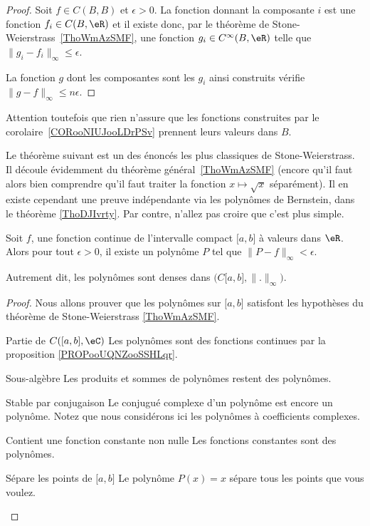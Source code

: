 \begin{proof}
    Soit \( f \in C(B,B)\) et \( \epsilon>0\). La fonction donnant la composante \( i\) est une fonction \( f_i\in C(B,\eR)\) et il existe donc, par le théorème de Stone-Weierstrass~\ref{ThoWmAzSMF}, une fonction \( g_i\in  C^{\infty}(B,\eR)\) telle que \( \| g_i-f_i \|_{\infty}\leq \epsilon\).

    La fonction \( g\) dont les composantes sont les \( g_i\) ainsi construits vérifie \( \| g-f \|_{\infty}\leq n\epsilon\).
\end{proof}

Attention toutefois que rien n'assure que les fonctions construites par le corolaire~\ref{CORooNIUJooLDrPSv} prennent leurs valeurs dans \( B\).

Le théorème suivant est un des énoncés les plus classiques de Stone-Weierstrass. Il découle évidemment du théorème général~\ref{ThoWmAzSMF} (encore qu'il faut alors bien comprendre qu'il faut traiter la fonction \( x\mapsto \sqrt{x}\) séparément). Il en existe cependant une preuve indépendante via les polynômes de Bernstein, dans le théorème \ref{ThoDJIvrty}. Par contre, n'allez pas croire que c'est plus simple.

\begin{theorem}     \label{ThoGddfas}   
    Soit \( f\), une fonction continue de l'intervalle compact \( \mathopen[ a , b \mathclose]\) à valeurs dans \( \eR\). Alors pour tout \( \epsilon>0\), il existe un polynôme \( P\) tel que \( \| P-f \|_{\infty}<\epsilon\).

    Autrement dit, les polynômes sont denses dans \(\big(  C\mathopen[ a , b \mathclose],\| . \|_{\infty}\big)\).
\end{theorem}

\begin{proof}
    Nous allons prouver que les polynômes sur \( \mathopen[ a , b \mathclose]\) satisfont les hypothèses du théorème de Stone-Weierstrass \ref{ThoWmAzSMF}.
    \begin{subproof}
    \item[Partie de $ C(\lbrack a , b\rbrack,\eC)$]
        Les polynômes sont des fonctions continues par la proposition \ref{PROPooUQNZooSSHLqr}.
    \item[Sous-algèbre]
        Les produits et sommes de polynômes restent des polynômes.
    \item[Stable par conjugaison]
        Le conjugué complexe d'un polynôme est encore un polynôme. Notez que nous considérons ici les polynômes à coefficients complexes.
    \item[Contient une fonction constante non nulle]
        Les fonctions constantes sont des polynômes.
    \item[Sépare les points de \( \mathopen\lbrack a , b \mathclose\rbrack\)]
        Le polynôme \( P(x)=x\) sépare tous les points que vous voulez.
    \end{subproof}
\end{proof}

